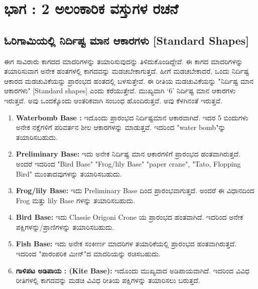 
\chapter[ಭಾಗ -  2]{ಭಾಗ :  2 ಅಲಂಕಾರಿಕ ವಸ್ತುಗಳ ರಚನೆ}\label{chap2}
 
 \section{ಓರಿಗಾಮಿಯಲ್ಲಿ ನಿರ್ದಿಷ್ಟ ಮಾನ ಆಕಾರಗಳು [Standard Shapes]}
 
 ಈಗ ಸಾವಿರಾರು ಕಾಗದದ ಮಾದರಿಗಳನ್ನು ತಯಾರಿಸುವುದನ್ನು ತಿಳಿದುಕೊಂಡಿದ್ದೇವೆ. ಈ ಕಾಗದ ಮಾದರಿಗಳನ್ನು ತಯಾರಿಸುವಾಗ ಅನೇಕ ಹಂತಗಳಲ್ಲಿ ಕಾಗದವನ್ನು ಮಡಚಬೇಕಾಗುತ್ತದೆ. ಹೀಗೆ ಮಡಚಬೇಕಾದರೆ, ಒಂದು ನಿರ್ದಿಷ್ಟ ಆಕಾರದ ಮಡಚುವಿಕೆಯನ್ನು ಪ್ರಾರಂಭದ ಹಂತದಲ್ಲಿ ಬಳಸುತ್ತೇವೆ. ಈ ರೀತಿಯ ಮಡಚುವಿಕೆಯನ್ನು "ನಿರ್ದಿಷ್ಟ ಮಾನ ಆಕಾರಗಳು" [Standard shapes] ಎಂದು ಕರೆಯುತ್ತೇವೆ. ಮುಖ್ಯವಾಗಿ `6' ನಿರ್ದಿಷ್ಟ ಮಾನ ಆಕಾರಗಳು ಇರುತ್ತವೆ. ಅವು ಒಂದಕ್ಕೊಂದು ಆಂತರಿಕವಾಗಿ ಸಂಬಂಧ ಹೊಂದಿರುತ್ತವೆ. ಅವು ಕೆಳಗಿನಂತೆ ಇರುತ್ತವೆ. 
  \begin{enumerate}
  \item[{\bf [1]}] \textbf{Waterbomb Base :} ಇದೊಂದು ಪ್ರಾರಂಭದ ನಿರ್ದಿಷ್ಟಮಾನ ಆಕಾರ\-ವಾಗಿದೆ. ಇದರ 5 ಬಿಂದುಗಳು ಅನೇಕ ನಕ್ಷೆಗಳಿಗೆ ಪರಿವರ್ತನ ಶೀಲ ಆಕಾರಗಳನ್ನು ಮಾಡುತ್ತವೆ. ಇದರಿಂದ "water bomb"ನ್ನು ತಯಾರಿಸಬಹುದು.

\medskip
  
  \item[{\bf [2]}] \textbf{Preliminary Base:} ಇದು ಅನೇಕ ನಿರ್ದಿಷ್ಟ ಮಾನ ಆಕಾರಗಳಿಗೆ ಪ್ರಾರಂಭದ ಹಂತವಾಗಿರುತ್ತದೆ. ಅಂದರೆ ಇದರಿಂದ "Bird Base" "Frog/lily Base" "paper crane", "Tato, Flopping Bird"  ಮುಂತಾದವುಗಳನ್ನು ತಯಾರಿಸಬಹುದು.  

\medskip
  
  \item[{\bf [3]}] \textbf{Frog/lily Base:} ಇದು Preliminary Base ದಿಂದ ಪ್ರಾರಂಭವಾಗುತ್ತದೆ. ಅಂದರೆ ಈ ವಿಧಾನದಿಂದ Frog ಮತ್ತು lily Base ಗಳನ್ನು ತಯಾರಿಸಬಹುದು.

\medskip
   
  \item[{\bf [4]}] \textbf{Bird  Base:} ಇದು Classie Origoni Crone ಯ ಪ್ರಾರಂಭದ ಹಂತವಾಗಿದೆ. ಇದರಿಂದ ಅನೇಕ ಪಕ್ಷಿಗಳನ್ನು/ಪ್ರಾಣಿಗಳನ್ನು ತಯಾರಿಸಬಹುದು. 

\eject

  \medskip
  
  \item[{\bf [5]}] \textbf{Fish Base:}  ಇದು ಅನೇಕ ಸಂಕೀರ್ಣ ಮಾದರಿಗಳ ತಯಾರಿಕೆಯಲ್ಲಿ ಪ್ರಾರಂಭದ ಹಂತವಾಗಿರುತ್ತದೆ. ಇದರಿಂದ "ಪಾರಂಪರಿಕ ಮೀನ್"ದ ಮಾದರಿಯನ್ನು ರಚಿಸಬಹುದು.
  
  \medskip
  
  \item[{\bf [6]}] \textbf{ಗಾಳಿಪಟ ಅಡಿಪಾಯ : (Kite Base):} ಇದೊಂದು ಮುಖ್ಯವಾದ ಅಡಿಪಾಯವಾಗಿದೆ. ಇದರಿಂದ ವಿವಿಧ ರೀತಿಗಳಲ್ಲಿ ಕಾಗದವನ್ನು ಮಡಚಿ ವಿವಿಧ ರೀತಿಯ ಪಕ್ಷಿಗಳನ್ನು ತಯಾರಿಸಲು ಬರುತ್ತದೆ. 
\end{enumerate}

